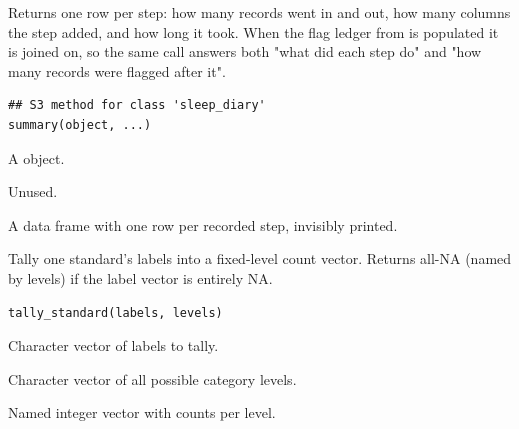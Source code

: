\documentclass[a4paper]{book}
\begin{document}
%
\begin{Description}
Returns one row per step: how many records went in and out, how many columns
the step added, and how long it took. When the flag ledger from
 is populated it is joined on, so the same call answers both
"what did each step do" and "how many records were flagged after it".
\end{Description}
%
\begin{Usage}
\begin{verbatim}
## S3 method for class 'sleep_diary'
summary(object, ...)
\end{verbatim}
\end{Usage}
%
\begin{Arguments}
\begin{ldescription}
\item[\code{object}] A  object.

\item[\code{...}] Unused.
\end{ldescription}
\end{Arguments}
%
\begin{Value}
A data frame with one row per recorded step, invisibly printed.
\end{Value}
%
\begin{Description}
Tally one standard's labels into a fixed-level count vector.
Returns all-NA (named by levels) if the label vector is entirely NA.
\end{Description}
%
\begin{Usage}
\begin{verbatim}
tally_standard(labels, levels)
\end{verbatim}
\end{Usage}
%
\begin{Arguments}
\begin{ldescription}
\item[\code{labels}] Character vector of labels to tally.

\item[\code{levels}] Character vector of all possible category levels.
\end{ldescription}
\end{Arguments}
%
\begin{Value}
Named integer vector with counts per level.
\end{Value}
\end{document}
